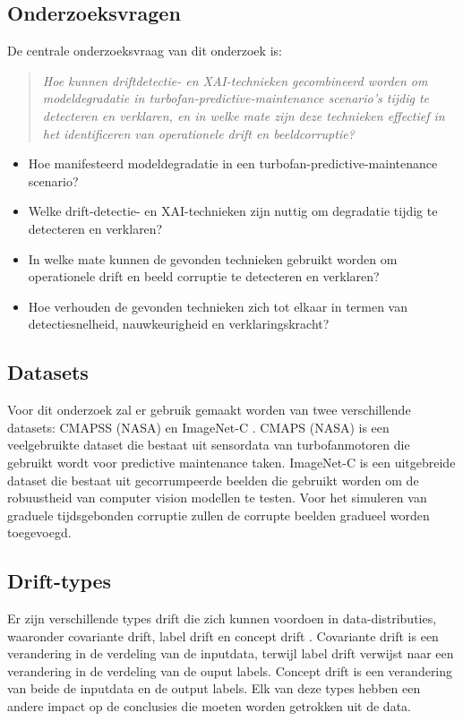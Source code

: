 \subsection{Onderzoeksvragen}
De centrale onderzoeksvraag van dit onderzoek is:
\begin{quote}
	\textit{Hoe kunnen driftdetectie- en XAI-technieken gecombineerd worden om modeldegradatie in turbofan-predictive-maintenance scenario's tijdig te detecteren en verklaren, en in welke mate zijn deze technieken effectief in het identificeren van operationele drift en beeldcorruptie?}
\end{quote}
\begin{itemize}
		\item Hoe manifesteerd modeldegradatie in een turbofan-predictive-maintenance scenario?
		\item Welke drift-detectie- en XAI-technieken zijn nuttig om degradatie tijdig te detecteren en verklaren?
		\item In welke mate kunnen de gevonden technieken gebruikt worden om operationele drift en beeld corruptie te detecteren en verklaren?
		\item Hoe verhouden de gevonden technieken zich tot elkaar in termen van detectiesnelheid, nauwkeurigheid en verklaringskracht?
\end{itemize}

\subsection{Datasets}
Voor dit onderzoek zal er gebruik gemaakt worden van twee verschillende datasets: CMAPSS (NASA) \autocite{Saxena2008} en ImageNet-C \autocite{Hendrycks2019}. CMAPS (NASA) is een veelgebruikte dataset die bestaat uit sensordata van turbofanmotoren die gebruikt wordt voor predictive maintenance taken. ImageNet-C is een uitgebreide dataset die bestaat uit gecorrumpeerde beelden die gebruikt worden om de robuustheid van computer vision modellen te testen. Voor het simuleren van graduele tijdsgebonden corruptie zullen de corrupte beelden gradueel worden toegevoegd.

\subsection{Drift-types}
Er zijn verschillende types drift die zich kunnen voordoen in data-distributies, waaronder covariante drift, label drift en concept drift \autocite{Bayram2022}. Covariante drift is een verandering in de verdeling van de inputdata, terwijl label drift verwijst naar een verandering in de verdeling van de ouput labels. Concept drift is een verandering van beide de inputdata en de output labels. Elk van deze types hebben een andere impact op de conclusies die moeten worden getrokken uit de data.

